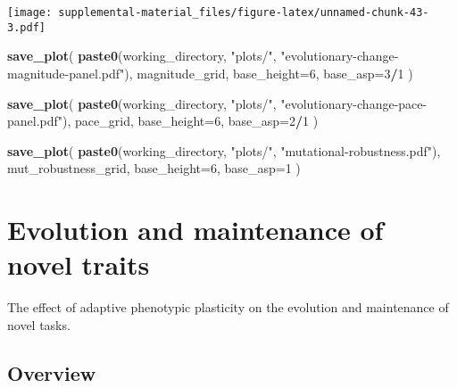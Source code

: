 \documentclass[]{book}
\newenvironment{Shaded}{\begin{snugshade}}{\end{snugshade}}
\newcommand{\DataTypeTok}[1]{\textcolor[rgb]{0.13,0.29,0.53}{#1}}
\newcommand{\DecValTok}[1]{\textcolor[rgb]{0.00,0.00,0.81}{#1}}
\newcommand{\KeywordTok}[1]{\textcolor[rgb]{0.13,0.29,0.53}{\textbf{#1}}}
\newcommand{\NormalTok}[1]{#1}
\newcommand{\OperatorTok}[1]{\textcolor[rgb]{0.81,0.36,0.00}{\textbf{#1}}}
\newcommand{\StringTok}[1]{\textcolor[rgb]{0.31,0.60,0.02}{#1}}
\begin{document}
\texttt{[image: supplemental-material\_files/figure-latex/unnamed-chunk-43-3.pdf]}

\begin{Shaded}
\begin{Highlighting}[]
\KeywordTok{save_plot}\NormalTok{(}
  \KeywordTok{paste0}\NormalTok{(working_directory, }\StringTok{"plots/"}\NormalTok{, }\StringTok{"evolutionary-change-magnitude-panel.pdf"}\NormalTok{),}
\NormalTok{  magnitude_grid,}
  \DataTypeTok{base_height=}\DecValTok{6}\NormalTok{,}
  \DataTypeTok{base_asp=}\DecValTok{3}\OperatorTok{/}\DecValTok{1}
\NormalTok{)}

\KeywordTok{save_plot}\NormalTok{(}
  \KeywordTok{paste0}\NormalTok{(working_directory, }\StringTok{"plots/"}\NormalTok{, }\StringTok{"evolutionary-change-pace-panel.pdf"}\NormalTok{),}
\NormalTok{  pace_grid,}
  \DataTypeTok{base_height=}\DecValTok{6}\NormalTok{,}
  \DataTypeTok{base_asp=}\DecValTok{2}\OperatorTok{/}\DecValTok{1}
\NormalTok{)}

\KeywordTok{save_plot}\NormalTok{(}
  \KeywordTok{paste0}\NormalTok{(working_directory, }\StringTok{"plots/"}\NormalTok{, }\StringTok{"mutational-robustness.pdf"}\NormalTok{),}
\NormalTok{  mut_robustness_grid,}
  \DataTypeTok{base_height=}\DecValTok{6}\NormalTok{,}
  \DataTypeTok{base_asp=}\DecValTok{1}
\NormalTok{)}
\end{Highlighting}
\end{Shaded}

\hypertarget{evolution-and-maintenance-of-novel-traits}{%
\chapter{Evolution and maintenance of novel traits}\label{evolution-and-maintenance-of-novel-traits}}

The effect of adaptive phenotypic plasticity on the evolution and maintenance of novel tasks.

\hypertarget{overview-2}{%
\section{Overview}\label{overview-2}}
\end{document}
